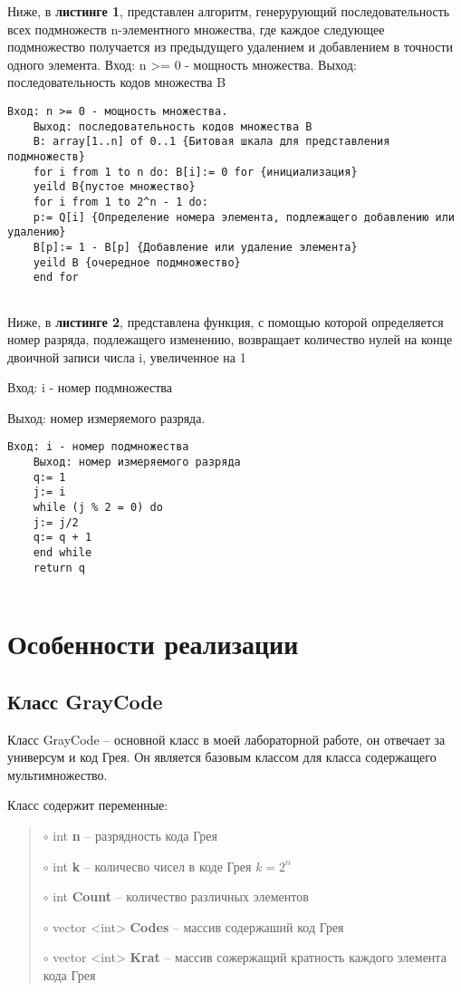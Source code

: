 \documentclass[10pt,a4paper,final]{article} %
\begin{document}
Ниже, в \textbf{листинге 1}, представлен алгоритм, генерурующий последовательность всех подмножеств n-элементного множества, где каждое следующее подмножество получается из предыдущего удалением и добавлением в точности одного элемента. 
Вход: n >= 0 - мощность множества.
Выход: последовательность кодов множества B 

\begin{lstlisting}[caption={Построение бинарного кода Грея}]
	Вход: n >= 0 - мощность множества.
	Выход: последовательность кодов множества B 
	B: array[1..n] of 0..1 {Битовая шкала для представления подмножеств}
	for i from 1 to n do: B[i]:= 0 for {инициализация}
	yeild B{пустое множество}
	for i from 1 to 2^n - 1 do: 
	p:= Q[i] {Определение номера элемента, подлежащего добавлению или удалению}
	B[p]:= 1 - B[p] {Добавление или удаление элемента}
	yeild B {очередное подмножество}
	end for  
	
\end{lstlisting}

\par Ниже, в \textbf{{листинге 2}}, представлена функция, с помощью которой определяется номер разряда, подлежащего изменению, возвращает количество нулей на конце двоичной записи числа i, увеличенное на 1
\par Вход: i - номер подмножества 
\par Выход: номер измеряемого разряда.

\begin{lstlisting}[caption={Функция определения номера измеряемого разряда}]
	Вход: i - номер подмножества
	Выход: номер измеряемого разряда
	q:= 1
	j:= i
	while (j % 2 = 0) do
	j:= j/2
	q:= q + 1
	end while
	return q  
	
\end{lstlisting}

\newpage
\section {Особенности реализации}
\subsection {Класс GrayCode}
\par Класс GrayCode -- основной класс в моей лабораторной работе, он отвечает за универсум и код Грея. Он является базовым классом для класса содержащего мультимножество.

\par Класс содержит переменные:
\begin{quote}
	$\circ$ int \textbf{n} -- разрядность кода Грея
	
	$\circ$ int \textbf{k} -- количесво чисел в коде Грея $k=2^n$
	 
	$\circ$ int \textbf{Count} -- количество различных элементов
	 
	$\circ$ vector <int> \textbf{Codes} -- массив содержаший код Грея
	
	$\circ$ vector <int> \textbf{Krat} -- массив сожержащий кратность каждого элемента кода Грея


\end{quote}
\end{document}
